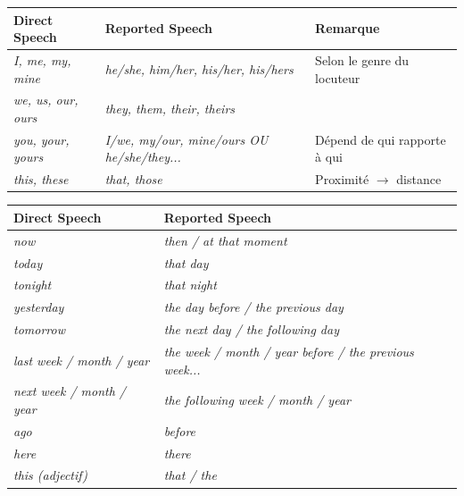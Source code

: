 \documentclass[11pt]{article}
\newcommand{\eng}[1]{\ifmmode\text{\textit{#1}}\else\begingroup\selectlanguage{english}\itshape #1\endgroup\fi}
\begin{document}
\begin{propriete}
\begin{center}
\begin{tabularx}{\linewidth}{|X|X|X|}
\hline
\rowcolor{popblueL} Direct Speech & Reported Speech & Remarque \\
\hline
\eng{I, me, my, mine} & \eng{he/she, him/her, his/her, his/hers} & Selon le genre du locuteur \\
\hline
\eng{we, us, our, ours} & \eng{they, them, their, theirs} & \\
\hline
\eng{you, your, yours} & \eng{I/we, my/our, mine/ours} OU \eng{he/she/they...} & Dépend de qui rapporte à qui \\
\hline
\eng{this, these} & \eng{that, those} & Proximité $\to$ distance \\
\hline
\end{tabularx}
\end{center}
\end{propriete}

\begin{propriete}
\begin{center}
\begin{tabularx}{\linewidth}{|X|X|}
\hline
\rowcolor{popblueL} Direct Speech & Reported Speech \\
\hline
\eng{now} & \eng{then} / \eng{at that moment} \\
\hline
\eng{today} & \eng{that day} \\
\hline
\eng{tonight} & \eng{that night} \\
\hline
\eng{yesterday} & \eng{the day before} / \eng{the previous day} \\
\hline
\eng{tomorrow} & \eng{the next day} / \eng{the following day} \\
\hline
\eng{last week / month / year} & \eng{the week / month / year before} / \eng{the previous week...} \\
\hline
\eng{next week / month / year} & \eng{the following week / month / year} \\
\hline
\eng{ago} & \eng{before} \\
\hline
\eng{here} & \eng{there} \\
\hline
\eng{this (adjectif)} & \eng{that} / \eng{the} \\
\hline
\end{tabularx}
\end{center}
\end{propriete}
\end{document}
